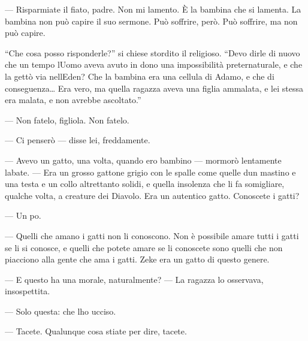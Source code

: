--- Risparmiate il fiato, padre. Non mi lamento. È la bambina che si
lamenta. La bambina non può capire il suo sermone. Può soffrire, però.
Può soffrire, ma non può capire.

``Che cosa posso risponderle?'' si chiese stordito il religioso. ``Devo
dirle di nuovo che un tempo l\textquotesingle Uomo aveva avuto in dono
una impossibilità preternaturale, e che la gettò via
nell\textquotesingle Eden? Che la bambina era una cellula di Adamo, e
che di conseguenza\ldots{} Era vero, ma quella ragazza aveva una figlia
ammalata, e lei stessa era malata, e non avrebbe ascoltato.''

--- Non fatelo, figliola. Non fatelo.

--- Ci penserò --- disse lei, freddamente.

--- Avevo un gatto, una volta, quando ero bambino --- mormorò lentamente
l\textquotesingle abate. --- Era un grosso gattone grigio con le spalle
come quelle d\textquotesingle un mastino e una testa e un collo
altrettanto solidi, e quella insolenza che li fa somigliare, qualche
volta, a creature dei Diavolo. Era un autentico gatto. Conoscete i
gatti?

--- Un po\textquotesingle.

--- Quelli che amano i gatti non li conoscono. Non è possibile amare
tutti i gatti se li si conosce, e quelli che potete amare se li
conoscete sono quelli che non piacciono alla gente che ama i gatti. Zeke
era un gatto di questo genere.

--- E questo ha una morale, naturalmente? --- La ragazza lo osservava,
insospettita.

--- Solo questa: che l\textquotesingle ho ucciso.

--- Tacete. Qualunque cosa stiate per dire, tacete.

